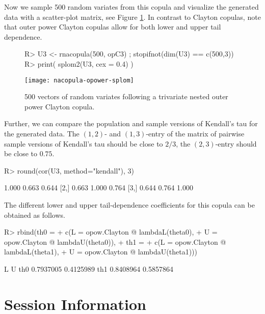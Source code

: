 \documentclass[nojss,article]{jss}
\theoremstyle{mythmstyle}
\newcommand*{\setcapwidth}[1]{}
\begin{document}
Now we sample 500 random variates from this copula and visualize the generated
data with a scatter-plot matrix, see Figure \ref{fig:NAC_opClayton}. In contrast
to Clayton copulas, note that outer power Clayton copulas allow for both lower
and upper tail dependence.
\begin{figure}[htbp]
\centering
\begin{Schunk}
\begin{Sinput}
R> U3 <- rnacopula(500, opC3) ; stopifnot(dim(U3) == c(500,3))
R> print( splom2(U3, cex = 0.4) )
\end{Sinput}
\end{Schunk}
\texttt{[image: nacopula-opower-splom]}
  \setcapwidth{\textwidth}%
  \caption{500 vectors of random variates following a trivariate nested outer
power Clayton copula.}
  \label{fig:NAC_opClayton}
\end{figure}

Further, we can compare the population and sample versions of Kendall's tau for
the generated data. The $(1,2)$- and $(1,3)$-entry of the matrix of
pairwise sample versions of Kendall's tau should be close to $2/3$, the
$(2,3)$-entry should be close to $0.75$.
\begin{Schunk}
\begin{Sinput}
R> round(cor(U3, method="kendall"), 3)
\end{Sinput}
\begin{Soutput}
      [,1]  [,2]  [,3]
[1,] 1.000 0.663 0.644
[2,] 0.663 1.000 0.764
[3,] 0.644 0.764 1.000
\end{Soutput}
\end{Schunk}

The different lower and upper tail-dependence coefficients for this copula can
be obtained as follows.
\begin{Schunk}
\begin{Sinput}
R> rbind(th0 =
+        c(L = opow.Clayton @ lambdaL(theta0),
+          U = opow.Clayton @ lambdaU(theta0)),
+        th1 =
+        c(L = opow.Clayton @ lambdaL(theta1),
+          U = opow.Clayton @ lambdaU(theta1)))
\end{Sinput}
\begin{Soutput}
            L         U
th0 0.7937005 0.4125989
th1 0.8408964 0.5857864
\end{Soutput}
\end{Schunk}


\section{Session Information}
\end{document}
